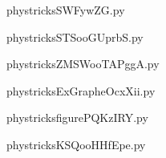     \newcommand{\CaptionFigSWFywZG}{<+Type your caption here+>}
    \begin{center}
        
    \end{center}
    phystricksSWFywZG.py

    

    \clearpage
    


    \newcommand{\CaptionFigSTSooGUprbS}{<+Type your caption here+>}
    \begin{center}
        
    \end{center}
    phystricksSTSooGUprbS.py

    

    \clearpage
    


    \newcommand{\CaptionFigZMSWooTAPggA}{<+Type your caption here+>}
    \begin{center}
        
    \end{center}
    phystricksZMSWooTAPggA.py

    

    \clearpage
    


    \newcommand{\CaptionFigExGrapheOcxXii}{<+Type your caption here+>}
    \begin{center}
        
    \end{center}
    phystricksExGrapheOcxXii.py

    

    \clearpage
    


    \newcommand{\CaptionFigfigurePQKzIRY}{<+Type your caption here+>}
    \begin{center}
        
    \end{center}
    phystricksfigurePQKzIRY.py

    

    \clearpage
    


    \newcommand{\CaptionFigKSQooHHfEpe}{<+Type your caption here+>}
    \begin{center}
        
    \end{center}
    phystricksKSQooHHfEpe.py

